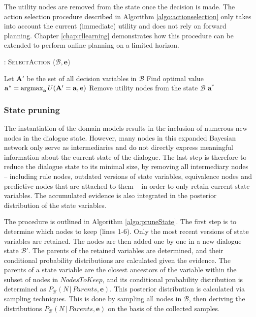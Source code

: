 The utility nodes are removed from the state once the decision is made. The action selection procedure described in Algorithm \ref{algo:actionselection} only takes into account the current (immediate) utility and does not rely on forward planning.  Chapter \ref{chap:rllearning} demonstrates how this procedure can be extended to perform online planning on a limited horizon. 


\begin{algorithm}[h]
\caption{: \textsc{SelectAction} ($\mathcal{B}, \mathbf{e}$)}
\begin{algorithmic}[1] \vspace{1mm}
\STATE Let $\mathbf{A}'$ be the set of all decision variables in $\mathcal{B}$
\STATE Find optimal value $\mathbf{a}^* = \argmax_{\mathbf{a}} U(\mathbf{A}' = \mathbf{a}, \mathbf{e})$
\STATE Remove utility nodes from the state $\mathcal{B}$
\RETURN $\mathbf{a}^*$
\end{algorithmic}
\label{algo:actionselection}
\end{algorithm}

\subsubsection*{State pruning}

The instantiation of the domain models results in the inclusion of numerous new nodes in the dialogue state. However, many nodes in this expanded Bayesian network  only serve as intermediaries and do not directly express meaningful information about the current state of the dialogue. The last step is therefore to reduce the dialogue state to its minimal size, by removing all intermediary nodes -- including rule nodes, outdated versions of state variables, equivalence nodes and predictive nodes that are attached to them -- in order to only retain current state variables. The accumulated evidence is also integrated in the posterior distribution of the state variables.

The procedure is outlined in Algorithm \ref{algo:pruneState}. The first step is to determine which nodes to keep (lines 1-6).  Only the most recent versions of state variables are retained. 
The nodes are then added one by one in a new dialogue state $\mathcal{B}'$.  The parents of the retained variables are determined, and their conditional probability distributions are calculated given the evidence.  The parents of a state variable are the closest ancestors of the variable within the subset of nodes in $\mathit{NodesToKeep}$, and its conditional probability distribution is determined as $P_{\mathcal{B}}(N \, | \, \mathit{Parents}, \mathbf{e})$.  This posterior distribution is calculated via sampling techniques. This is done by sampling all nodes in $\mathcal{B}$, then deriving the distributions $P_{\mathcal{B}}(N \, | \, \mathit{Parents}, \mathbf{e})$ on the basis of the collected samples.  

